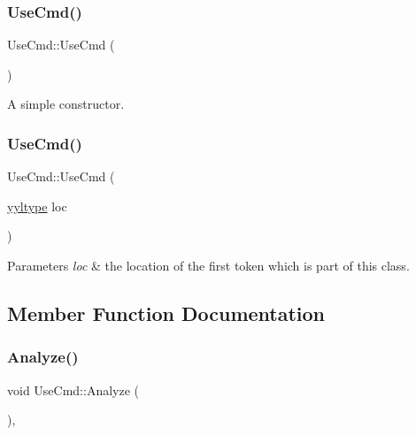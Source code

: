 \subsubsection{\texorpdfstring{Use\+Cmd()}{UseCmd()}\hspace{0.1cm}{\footnotesize\ttfamily [1/2]}}
{\footnotesize\ttfamily Use\+Cmd\+::\+Use\+Cmd (\begin{DoxyParamCaption}{ }\end{DoxyParamCaption})\hspace{0.3cm}{\ttfamily [inline]}}

A simple constructor. \mbox{\label{class_use_cmd_ae0dc39f5419dd6a38c7c5a46ef67f823}} 
\subsubsection{\texorpdfstring{Use\+Cmd()}{UseCmd()}\hspace{0.1cm}{\footnotesize\ttfamily [2/2]}}
{\footnotesize\ttfamily Use\+Cmd\+::\+Use\+Cmd (\begin{DoxyParamCaption}\item[{\hyperlink{structyyltype}{yyltype}}]{loc }\end{DoxyParamCaption})\hspace{0.3cm}{\ttfamily [inline]}}


\begin{DoxyParams}{Parameters}
{\em loc} & the location of the first token which is part of this class. \\
\hline
\end{DoxyParams}


\subsection{Member Function Documentation}
\mbox{\label{class_use_cmd_a3da3017201b8b7573481cf58c4702050}} 
\subsubsection{\texorpdfstring{Analyze()}{Analyze()}}
{\footnotesize\ttfamily void Use\+Cmd\+::\+Analyze (\begin{DoxyParamCaption}{ }\end{DoxyParamCaption})\hspace{0.3cm}{\ttfamily [inline]}, {\ttfamily [virtual]}}

